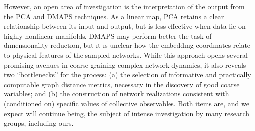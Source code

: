   However, an open area of investigation is the interpretation of the
  output from the PCA and DMAPS techniques.
  As a linear map, PCA retains a clear relationship between its input
  and output, but is less effective when data lie on highly nonlinear
  manifolds.
  DMAPS may perform better the task of dimensionality reduction, but
  it is unclear how the embedding coordinates relate to physical
  features of the sampled networks.
  While this approach opens several promising avenues in
  coarse-graining complex network dynamics, it also reveals two
  ``bottlenecks'' for the process: (a) the selection of informative
  and practically computable graph distance metrics, necessary in the
  discovery of good coarse variables; and (b) the construction of
  network realizations consistent with (conditioned on) specific
  values of collective observables.
  Both items are, and we expect will continue being, the subject of
  intense investigation by many research groups, including ours.


